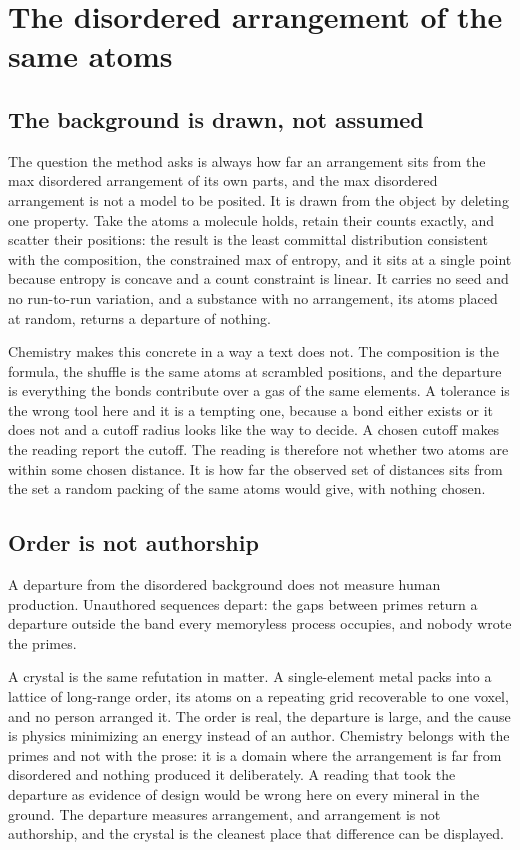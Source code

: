\chapter{The disordered arrangement of the same atoms}

\section{The background is drawn, not assumed}

The question the method asks is always how far an arrangement sits from the max disordered
arrangement of its own parts, and the max disordered arrangement is not a model to be posited. It is
drawn from the object by deleting one property. Take the atoms a molecule holds, retain their counts
exactly, and scatter their positions: the result is the least committal distribution consistent with
the composition, the constrained max of entropy, and it sits at a single point because entropy is
concave and a count constraint is linear. It carries no seed and no run-to-run variation, and a
substance with no arrangement, its atoms placed at random, returns a departure of nothing.

Chemistry makes this concrete in a way a text does not. The composition is the formula, the shuffle
is the same atoms at scrambled positions, and the departure is everything the bonds contribute over a
gas of the same elements. A tolerance is the wrong tool here and it is a tempting one, because a bond
either exists or it does not and a cutoff radius looks like the way to decide. A chosen cutoff makes
the reading report the cutoff. The reading is therefore not whether two atoms are within some chosen
distance. It is how far the observed set of distances sits from the set a random packing of the same
atoms would give, with nothing chosen.

\section{Order is not authorship}

A departure from the disordered background does not measure human production. Unauthored sequences
depart: the gaps between primes return a departure outside the band every memoryless process
occupies, and nobody wrote the primes.

A crystal is the same refutation in matter. A single-element metal packs into a lattice of long-range
order, its atoms on a repeating grid recoverable to one voxel, and no person arranged it. The order
is real, the departure is large, and the cause is physics minimizing an energy instead of an author.
Chemistry belongs with the primes and not with the prose: it is a domain where the arrangement is far
from disordered and nothing produced it deliberately. A reading that took the departure as evidence of
design would be wrong here on every mineral in the ground. The departure measures arrangement, and
arrangement is not authorship, and the crystal is the cleanest place that difference can be displayed.

